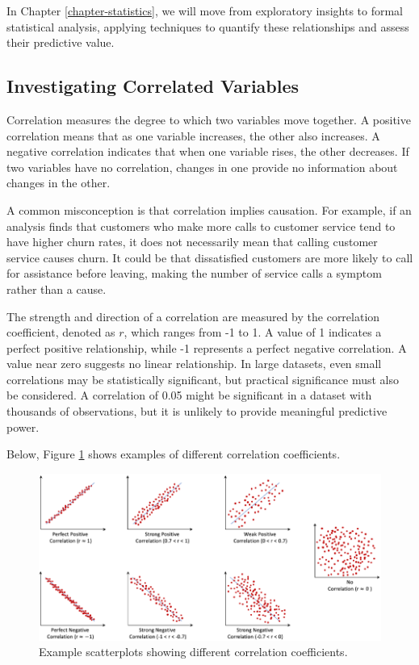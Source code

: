 \documentclass[
]{book}
\theoremstyle{definition}
\theoremstyle{definition}
\theoremstyle{definition}
\theoremstyle{definition}
\theoremstyle{remark}
\begin{document}
In Chapter \ref{chapter-statistics}, we will move from exploratory insights to formal statistical analysis, applying techniques to quantify these relationships and assess their predictive value.

\subsection{Investigating Correlated Variables}\label{investigating-correlated-variables}

Correlation measures the degree to which two variables move together. A positive correlation means that as one variable increases, the other also increases. A negative correlation indicates that when one variable rises, the other decreases. If two variables have no correlation, changes in one provide no information about changes in the other.

A common misconception is that correlation implies causation. For example, if an analysis finds that customers who make more calls to customer service tend to have higher churn rates, it does not necessarily mean that calling customer service causes churn. It could be that dissatisfied customers are more likely to call for assistance before leaving, making the number of service calls a symptom rather than a cause.

The strength and direction of a correlation are measured by the correlation coefficient, denoted as \(r\), which ranges from -1 to 1. A value of 1 indicates a perfect positive relationship, while -1 represents a perfect negative correlation. A value near zero suggests no linear relationship. In large datasets, even small correlations may be statistically significant, but practical significance must also be considered. A correlation of 0.05 might be significant in a dataset with thousands of observations, but it is unlikely to provide meaningful predictive power.

Below, Figure \ref{fig:correlation} shows examples of different correlation coefficients.

\begin{figure}

{\centering \includegraphics[width=1\linewidth]{images/correlation} 

}

\caption{Example scatterplots showing different correlation coefficients.}\label{fig:correlation}
\end{figure}
\end{document}
